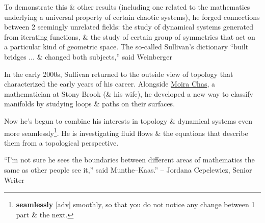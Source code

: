 \documentclass[oneside]{book}
\numberwithin{equation}{section}
\begin{document}
To demonstrate this \& other results (including one related to the mathematics underlying a universal property of certain chaotic systems), he forged connections between 2 seemingly unrelated fields: the study of dynamical systems generated from iterating functions, \& the study of certain group of symmetries that act on a particular kind of geometric space. The so-called Sullivan's dictionary ``built bridges $\ldots$ \& changed both subjects,'' said Weinberger

In the early 2000s, Sullivan returned to the outside view of topology that characterized the early years of his career. Alongside \href{https://www.math.stonybrook.edu/~moira/}{Moira Chas}, a mathematician at Stony Brook (\& his wife), he developed a new way to classify manifolds by studying loops \& paths on their surfaces.

Now he's begun to combine his interests in topology \& dynamical systems even more seamlessly\footnote{\textbf{seamlessly} [adv] smoothly, so that you do not notice any change between 1 part \& the next.}. He is investigating fluid flows \& the equations that describe them from a topological perspective.

``I'm not sure he sees the boundaries between different areas of mathematics the same as other people see it,'' said Munthe--Kaas.'' -- Jordana Cepelewicz, Senior Writer


\begin{thebibliography}{99}
	\bibitem[]{}
\end{thebibliography}


\printbibliography[heading=bibintoc]
	
\end{document}
